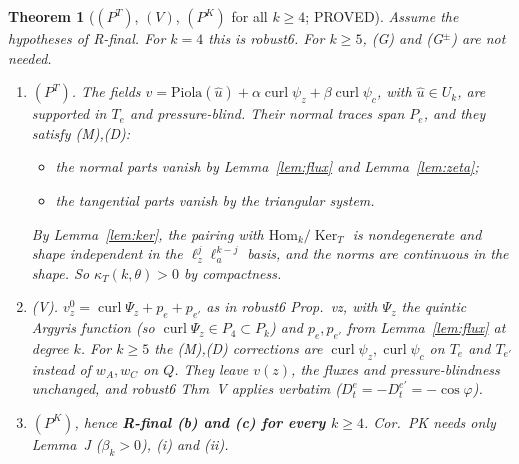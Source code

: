 \documentclass[11pt]{article}
\newtheorem{theorem}{Theorem}[section]
\theoremstyle{remark}
\begin{document}
\begin{theorem}[$(P^T)$, $(V)$, $(P^K)$ for all $k\ge4$; PROVED]\label{thm:allk}
Assume the hypotheses of R-final. For $k=4$ this is robust6. For $k\ge5$, (G) and (G$^\pm$) are not needed.
\begin{enumerate}
\item[(i)] \emph{$(P^T)$.} The fields $v=\mathrm{Piola}(\hat u)+\alpha\operatorname{curl}\psi_z+\beta\operatorname{curl}\psi_c$, with $\hat u\in U_k$, are supported
in $T_e$ and pressure-blind. Their normal traces span $P_e$, and they satisfy (M),(D):
\begin{itemize}
\item the normal parts vanish by Lemma~\ref{lem:flux} and Lemma~\ref{lem:zeta};
\item the tangential parts vanish by the triangular system.
\end{itemize}
By Lemma~\ref{lem:ker}, the pairing with $\mathrm{Hom}_k/\operatorname{Ker}_T$ is nondegenerate and shape independent in the $\ell_z^j\ell_a^{k-j}$ basis, and the norms
are continuous in the shape. So $\kappa_T(k,\theta)>0$ by compactness.
\item[(ii)] \emph{(V).} $v_z^0=\operatorname{curl}\Psi_z+p_e+p_{e'}$ as in robust6 Prop.~vz, with $\Psi_z$ the \emph{quintic} Argyris function (so
$\operatorname{curl}\Psi_z\in P_4\subset P_k$) and $p_e,p_{e'}$ from Lemma~\ref{lem:flux} at degree $k$. For $k\ge5$ the (M),(D) corrections are
$\operatorname{curl}\psi_z,\operatorname{curl}\psi_c$ on $T_e$ and $T_{e'}$ instead of $w_A,w_C$ on $Q$. They leave $v(z)$, the fluxes and
pressure-blindness unchanged, and robust6 Thm~V applies verbatim ($D_t^e=-D_t^{e'}=-\cos\varphi$).
\item[(iii)] \emph{$(P^K)$}, hence \textbf{R-final (b) and (c) for every $k\ge4$}. Cor.~PK needs only Lemma~J ($\beta_k>0$), (i) and (ii).
\end{enumerate}
\end{theorem}
\end{document}
